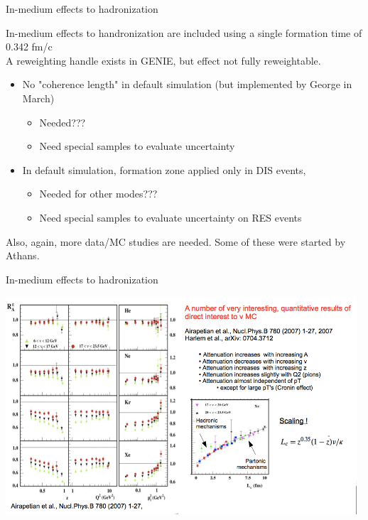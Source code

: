 \begin{frame}{In-medium effects to hadronization}

In-medium effects to handronization are included using a single formation time of 0.342 fm/c\\

A reweighting handle exists in GENIE, but effect not fully reweightable.\\

\begin{itemize}
\item No "coherence length" in default simulation (but implemented by George in March)
  \begin{itemize}
    \item Needed???
    \item Need special samples to evaluate uncertainty
  \end{itemize}
\item In default simulation, formation zone applied only in DIS events,
  \begin{itemize}
    \item Needed for other modes???
    \item Need special samples to evaluate uncertainty on RES events
  \end{itemize}
\end{itemize}

Also, again, more data/MC studies are needed. Some of these were started by Athans.

\end{frame}


\begin{frame}{In-medium effects to hadronization}
\begin{center}
  \includegraphics[width=0.98\textwidth]{./images/nuint/dis/hermes_slide.png}
\end{center}
\end{frame}


